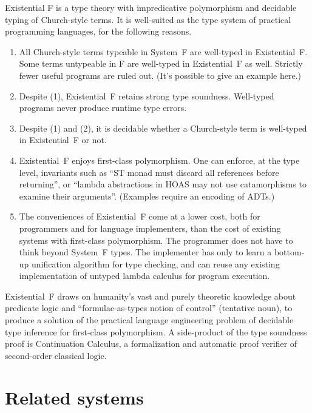 \documentclass{amsart}
\begin{document}
Existential F is a type theory with impredicative polymorphism
and decidable typing of Church-style terms. It is well-suited as
the type system of practical programming languages, for the
following reasons.
\begin{enumerate}
\item All Church-style terms typeable in System~F are well-typed
in Existential~F. Some terms untypeable in F are well-typed in
Existential~F as well. Strictly fewer useful programs are ruled
out. (It's possible to give an example here.)

\item Despite (1), Existential~F retains strong type soundness.
Well-typed programs never produce runtime type errors.

\item Despite (1) and (2), it is decidable whether a Church-style
term is well-typed in Existential~F or not.

\item Existential~F enjoys first-class polymorphism. One can
enforce, at the type level, invariants such as ``ST monad must
discard all references before returning'', or ``lambda
abstractions in HOAS may not use catamorphisms to examine their
arguments''. (Examples require an encoding of ADTs.)

\item The conveniences of Existential~F come at a lower cost,
both for programmers and for language implementers, than the cost
of existing systems with first-class polymorphism. The programmer
does not have to think beyond System~F types. The implementer has
only to learn a bottom-up unification algorithm for type
checking, and can reuse any existing implementation of untyped
lambda calculus for program execution.
\end{enumerate}

Existential~F draws on humanity's vast and purely theoretic
knowledge about predicate logic and ``formulae-as-types notion of
control'' (tentative noun), to produce a solution of the
practical language engineering problem of decidable type
inference for first-class polymorphism. A side-product of the
type soundness proof is Continuation Calculus, a formalization
and automatic proof verifier of second-order classical logic.


\section{Related systems}
\end{document}

